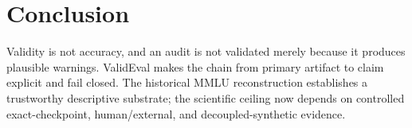 \section{Conclusion}

Validity is not accuracy, and an audit is not validated merely because it produces plausible
warnings. ValidEval makes the chain from primary artifact to claim explicit and fail closed. The
historical MMLU reconstruction establishes a trustworthy descriptive substrate; the scientific
ceiling now depends on controlled exact-checkpoint, human/external, and decoupled-synthetic evidence.
